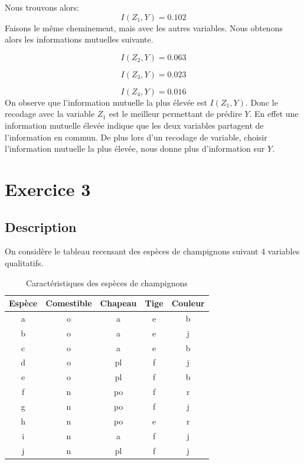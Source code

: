 \documentclass{article}
\begin{document}
Nous trouvons alors:
\[
  I(Z_1, Y)= 0.102
\]
Faisons le même cheminement, mais avec les autres variables. Nous obtenons alors les informations mutuelles suivante.

\[
I(Z_2,Y) = 0.063
\]

\[
I(Z_3,Y) = 0.023
\]

\[
I(Z_4,Y) = 0.016
\]
On observe que l'information mutuelle la plus élevée est $I(Z_1,Y)$. Donc le recodage avec la variable $Z_1$ est le meilleur permettant de prédire $Y$. En effet une information mutuelle élevée indique que les deux variables partagent de l'information en commun. De plus lors d'un recodage de variable, choisir l'information mutuelle la plus élevée, nous donne plus d'information sur $Y$.


\newpage
\section{Exercice 3}
\label{exercice3}
\subsection{Description}

On considère le tableau recensant des espèces de champignons suivant 4 variables qualitatifs. 

\begin{table}[h]
  \centering
  \caption{Caractéristiques des espèces de champignons}
  \begin{tabular}{@{}ccccc@{}}
  \toprule
  Espèce & Comestible & Chapeau & Tige & Couleur \\ \midrule
  a      & o          & a       & e    & b       \\
  b      & o          & a       & e    & j       \\
  c      & o          & a       & e    & b       \\
  d      & o          & pl      & f    & j       \\
  e      & o          & pl      & f    & b       \\
  f      & n          & po      & f    & r       \\
  g      & n          & po      & f    & j       \\
  h      & n          & po      & e    & r       \\
  i      & n          & a       & f    & j       \\
  j      & n          & pl      & f    & j       \\ \bottomrule
  \end{tabular}
  
  \label{tab:champignons}
  \end{table}
\end{document}
